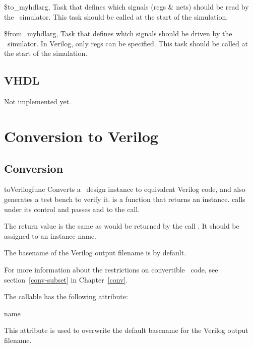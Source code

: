 \begin{funcdesc}{\$to_myhdl}{arg, }
Task that defines which signals (regs \& nets) should be
read by the \myhdl\ simulator.
This task should be called at the start of the simulation.
\end{funcdesc}

\begin{funcdesc}{\$from_myhdl}{arg, }
Task that defines which signals should be
driven by the \myhdl\ simulator. In Verilog, only regs
can be specified.
This task should be called at the start of the simulation.
\end{funcdesc}


\subsection{VHDL \label{ref-cosim-vhdl}}

Not implemented yet.

\section{Conversion to Verilog\label{ref-conv}}

\subsection{Conversion \label{ref-conv-conv}}

\begin{funcdesc}{toVerilog}{func  }
Converts a \myhdl\ design instance to equivalent Verilog
code, and also generates a test bench to verify it.
 is a function that returns an instance.
 calls  under its control
and passes  and  to the call.

The return value is the same as would be returned by the call
. It should be assigned
to an instance name.

The basename of the Verilog output filename is 
by default.

For more information about the restrictions on convertible
\myhdl\ code, see section~\ref{conv-subset} in
Chapter~\ref{conv}.
\end{funcdesc}

The  callable has the following attribute:

\begin{memberdesc}[toVerilog]{name}

This attribute is used to overwrite the default basename for the
Verilog output filename.

\end{memberdesc}

